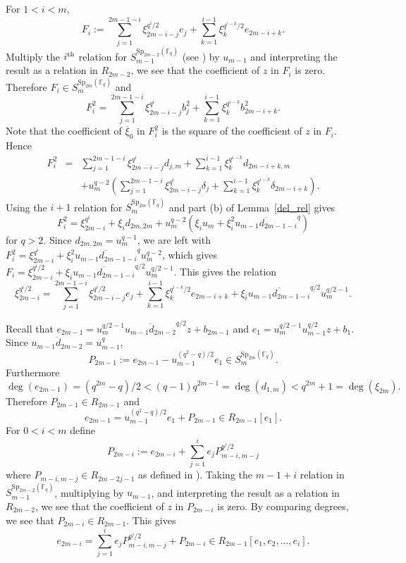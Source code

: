 \documentclass{amsart}
\newcommand{\field}{\mathbb{F}}
\newcommand{\syp}[2]{{{\text{Sp}_{{#1}}(\field_{#2})}}}
\begin{document}
For $1<i<m$,
$$F_i:=\sum_{j=1}^{2m-1-i} \xi_{2m-i-j}^{q^i/2} e_j +\sum_{k=1}^{i-1} \xi_k^{q^{i-k}/2} e_{2m-i+k}.$$
Multiply the $i^{\rm th}$ relation for  $S_{m-1}^{\syp{2m-2}{q}}$ (see \cite[Theorem 8.3.11]{benson-polyinvafinigrou:93})
by $u_{m-1}$ and interpreting the result as a relation in $R_{2m-2}$,
we see that the coefficient of $z$ in $F_i$ is zero. Therefore $F_i\in S_{m}^{\syp{2m}{q}}$ and
$$F_i^2=\sum_{j=1}^{2m-1-i} \xi_{2m-i-j}^{q^i} b^2_j +\sum_{k=1}^{i-1} \xi_k^{q^{i-k}} b^2_{2m-i+k}.$$
Note that the coefficient of $\overline{\xi}_0$ in $F_i^2$ is the square of the coefficient of $z$ in $F_i$.
Hence 
\begin{eqnarray*} F_i^2&=&\sum_{j=1}^{2m-1-i} \xi_{2m-i-j}^{q^i} d_{j,m} +\sum_{k=1}^{i-1} \xi_k^{q^{i-k}} d_{2m-i+k,m}\\
&&+u_m^{q-2}\left(\sum_{j=1}^{2m-1-i} \xi_{2m-i-j}^{q^i} \delta_j +\sum_{k=1}^{i-1} \xi_k^{q^{i-k}} \delta_{2m-i+k}\right).
\end{eqnarray*}
Using the $i+1$ relation for $S_{m}^{\syp{2m}{q}}$ and part (b) of Lemma~\ref{del_rel} gives
$$F_i^2=\xi_{2m-i}^{q^i}+\xi_i d_{2m,2m}+u_m^{q-2}\left(\xi_i u_m+\xi_i^2\overline{u_{m-1}d_{2m-1-i}}^q\right)$$
for $q>2$.
Since $d_{2m,2m}=u_m^{q-1}$, we are left with 
$F_i^2=\xi_{2m-i}^{q^i}+\xi_i^2\overline{u_{m-1}d_{2m-1-i}}^{q}u_m^{q-2}$,
which gives $F_i=\xi_{2m-i}^{q^i/2}+\xi_i \overline{u_{m-1}d_{2m-1-i}}^{q/2} u_m^{q/2-1}$. 
This gives the relation
\begin{equation}\label{Oodd-eqni}
\xi_{2m-i}^{q^i/2}=\sum_{j=1}^{2m-1-i} \xi_{2m-i-j}^{q^i/2} e_j +\sum_{k=1}^{i-1} \xi_k^{q^{i-k}/2} e_{2m-i+k}
+\xi_i \overline{u_{m-1}d_{2m-1-i}}^{q/2} u_m^{q/2-1}.
\end{equation}

Recall that $e_{2m-1}=u_m^{q/2-1}\overline{u_{m-1}d_{2m-2}}^{q/2}z+b_{2m-1}$ and
$e_1=u_m^{q/2-1}u_{m-1}^{q/2}z+b_1$. Since $\overline{u_{m-1}d_{2m-2}}=u_{m-1}^q$,
$$P_{2m-1}:=e_{2m-1}-u_{m-1}^{(q^2-q)/2}e_1\in S_{m}^{\syp{2m}{q}}.$$
Furthermore
$$\deg(e_{2m-1})=(q^{2m}-q)/2<(q-1)q^{2m-1}=\deg(d_{1,m})<q^{2m}+1=\deg(\xi_{2m}).$$
Therefore $P_{2m-1}\in R_{2m-1}$ and
\begin{equation} \label{Oodd-exrel1}
e_{2m-1}=u_{m-1}^{(q^2-q)/2}e_1+P_{2m-1}\in R_{2m-1}[e_1].
\end{equation} 
For $0<i<m$ define
$$P_{2m-i}:=e_{2m-i}+\sum_{j=1}^i e_jP_{m-i,m-j}^{q^j/2}$$
where $P_{m-i,m-j}\in R_{2m-2j-1}$ as defined in \cite[Proposition 8.3.7]{benson-polyinvafinigrou:93}).
Taking the $m-1+i$ relation in $S_{m-1}^{\syp{2m-2}{q}}$, multiplying by $u_{m-1}$, and interpreting the result as a relation in
$R_{2m-2}$, we see that the coefficient of $z$ in $P_{2m-i}$ is zero. By comparing degrees, we see that $P_{2m-i}\in R_{2m-1}$.
This gives 
\begin{equation} \label{Oodd-exrelgen}
e_{2m-i}=\sum_{j=1}^i e_jP_{m-i,m-j}^{q^j/2}+P_{2m-i}\in R_{2m-1}[e_1,e_2,\ldots,e_i].
\end{equation} 
\end{document}
